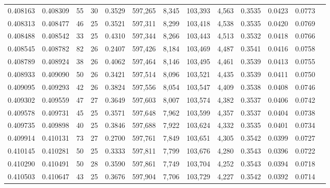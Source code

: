 \begin{tabular}{rrrrrrrrrrrrr}
0.408163 & 0.408309 &    55 &  30 &                                     0.3529 & 597,265 &   8,345 & 103,393 &   4,563 & 0.3535 & 0.0423 & 0.0773 \\
0.408313 & 0.408477 &    46 &  25 &                                     0.3521 & 597,311 &   8,299 & 103,418 &   4,538 & 0.3535 & 0.0420 & 0.0769 \\
0.408488 & 0.408542 &    33 &  25 &                                     0.4310 & 597,344 &   8,266 & 103,443 &   4,513 & 0.3532 & 0.0418 & 0.0766 \\
0.408545 & 0.408782 &    82 &  26 &                                     0.2407 & 597,426 &   8,184 & 103,469 &   4,487 & 0.3541 & 0.0416 & 0.0758 \\
0.408789 & 0.408924 &    38 &  26 &                                     0.4062 & 597,464 &   8,146 & 103,495 &   4,461 & 0.3539 & 0.0413 & 0.0755 \\
0.408933 & 0.409090 &    50 &  26 &                                     0.3421 & 597,514 &   8,096 & 103,521 &   4,435 & 0.3539 & 0.0411 & 0.0750 \\
0.409095 & 0.409293 &    42 &  26 &                                     0.3824 & 597,556 &   8,054 & 103,547 &   4,409 & 0.3538 & 0.0408 & 0.0746 \\
0.409302 & 0.409559 &    47 &  27 &                                     0.3649 & 597,603 &   8,007 & 103,574 &   4,382 & 0.3537 & 0.0406 & 0.0742 \\
0.409578 & 0.409731 &    45 &  25 &                                     0.3571 & 597,648 &   7,962 & 103,599 &   4,357 & 0.3537 & 0.0404 & 0.0738 \\
0.409735 & 0.409898 &    40 &  25 &                                     0.3846 & 597,688 &   7,922 & 103,624 &   4,332 & 0.3535 & 0.0401 & 0.0734 \\
0.409914 & 0.410131 &    73 &  27 &                                     0.2700 & 597,761 &   7,849 & 103,651 &   4,305 & 0.3542 & 0.0399 & 0.0727 \\
0.410145 & 0.410281 &    50 &  25 &                                     0.3333 & 597,811 &   7,799 & 103,676 &   4,280 & 0.3543 & 0.0396 & 0.0722 \\
0.410290 & 0.410491 &    50 &  28 &                                     0.3590 & 597,861 &   7,749 & 103,704 &   4,252 & 0.3543 & 0.0394 & 0.0718 \\
0.410503 & 0.410647 &    43 &  25 &                                     0.3676 & 597,904 &   7,706 & 103,729 &   4,227 & 0.3542 & 0.0392 & 0.0714 \\

\end{tabular}
